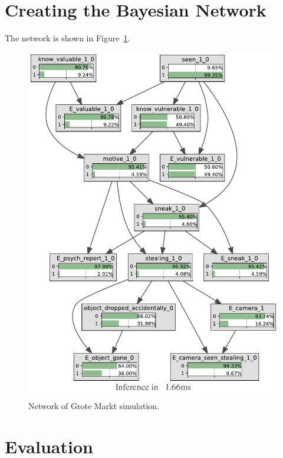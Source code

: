 \section{Creating the Bayesian Network}

The network is shown in Figure~\ref{wedding}.

\begin{figure}
\begin{center}
\includegraphics[width=1.2\linewidth]{../experiments/GroteMarkt/bnImage/BNIMAGEGroteMarkt.pdf}
\caption{Network of Grote Markt simulation.}
\label{wedding}
\end{center}
\end{figure}


\section{Evaluation}




